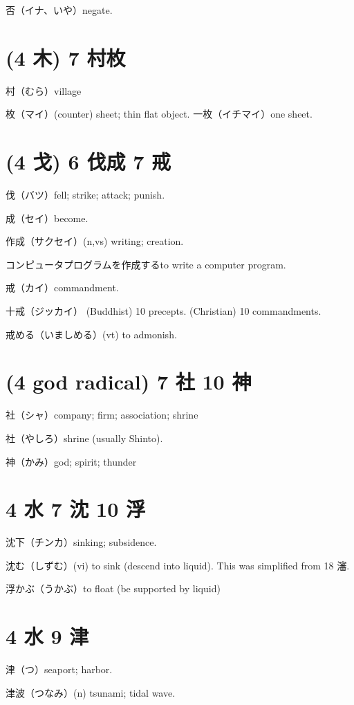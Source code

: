 否（イナ、いや）negate.

\section{(4 木) 7 村枚}

村（むら）village

枚（マイ）(counter) sheet; thin flat object.
一枚（イチマイ）one sheet.

\section{(4 戈) 6 伐成 7 戒}

伐（バツ）fell; strike; attack; punish.

成（セイ）become.

作成（サクセイ）(n,vs) writing; creation.

コンピュータプログラムを作成するto write a computer program.

戒（カイ）commandment.

十戒（ジッカイ）
(Buddhist) 10 precepts.
(Christian) 10 commandments.

戒める（いましめる）(vt) to admonish.

\section{(4 god radical) 7 社 10 神}

社（シャ）company; firm; association; shrine

社（やしろ）shrine (usually Shinto).

神（かみ）god; spirit; thunder

\section{4 水 7 沈 10 浮}

沈下（チンカ）sinking; subsidence.

沈む（しずむ）(vi) to sink (descend into liquid).
This was simplified from 18 瀋.

浮かぶ（うかぶ）to float (be supported by liquid)

\section{4 水 9 津}

津（つ）seaport; harbor.

津波（つなみ）(n) tsunami; tidal wave.

